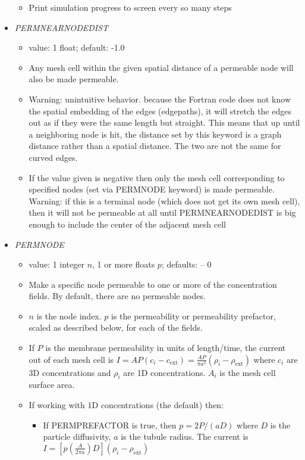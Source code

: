 \documentclass[12pt]{article}
\begin{document}
\begin{itemize}
\begin{itemize}
	\item Print simulation progress to screen every so many steps
\end{itemize}
%
\item {\it PERMNEARNODEDIST}
\begin{itemize}
	\item  value: 1 float; default: -1.0
	\item Any mesh cell within the given spatial distance of a permeable node will also be made permeable.
	\item {\color{red} Warning: unintuitive behavior.} because the Fortran code does not know the spatial embedding of the edges (edgepaths), it will stretch the edges out as if they were the same length but straight. This means that up until a neighboring node is hit, the distance set by this keyword is a graph distance rather than a spatial distance. The two are not the same for curved edges.
	\item If the value given is negative then only the mesh cell corresponding to specified nodes (set via PERMNODE keyword) is made permeable. {\color{red} Warning:} if this is a terminal node (which does not get its own mesh cell), then it will not be permeable at all until PERMNEARNODEDIST is big enough to include the center of the adjacent mesh cell
\end{itemize}
%
\item {\it PERMNODE}
\begin{itemize}
	\item  value: 1 integer $n$, 1 or more floats $p$; defaults: -- 0
	\item Make a specific node permeable to one or more of the concentration fields. By default, there are no permeable nodes.	
	\item $n$ is the node index. $p$ is the permeability or permeability prefactor, scaled as described below, for each of the fields.
	\item If $P$ is the membrane permeability in units of length/time, the current out of each mesh cell is $I = AP (c_i - c_\text{ext}) = \frac{AP}{\pi a^2} (\rho_i - \rho_\text{ext})$ where $c_i$ are 3D concentrations and $\rho_i$ are 1D concentrations. $A_i$ is the mesh cell surface area.
	\item If working with 1D concentrations (the default) then:
	\begin{itemize}
	\item If PERMPREFACTOR is true, then $p = 2P/(aD)$ where $D$ is the particle diffusivity, $a$ is the tubule radius. The current is $I = [p (\frac{A}{2\pi a}) D](\rho_i - \rho_\text{ext})$ 

\end{itemize}
\end{itemize}
\end{itemize}
\end{document}
